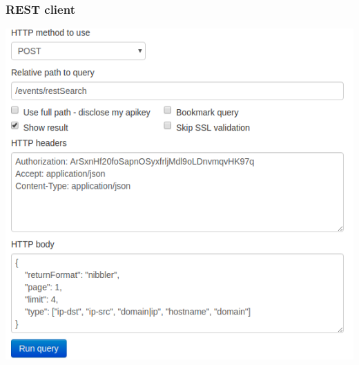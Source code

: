 \begin{frame}
  \frametitle{REST client}
  \begin{center}
    \includegraphics[scale=0.5]{nibbler_rest_client.png}
  \end{center}
\end{frame}


